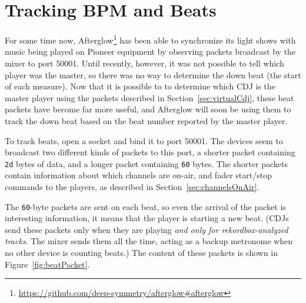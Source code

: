 \documentclass[11pt]{article}
\begin{document}
\section{Tracking BPM and Beats}
\label{sec:beatPackets}

For some time now,
Afterglow\footnote{\url{https://github.com/deep-symmetry/afterglow\#afterglow}}
has been able to synchronize its light shows with music being played
on Pioneer equipment by observing packets broadcast by the mixer to
port 50001. Until recently, however, it was not possible to tell which
player was the master, so there was no way to determine the down beat
(the start of each measure). Now that it is possible to to determine
which CDJ is the master player using the packets described in
Section~\ref{sec:virtualCdj}, these beat packets have become far more
useful, and Afterglow will soon be using them to track the down beat
based on the beat number reported by the master player.

To track beats, open a socket and bind it to port 50001. The devices
seem to broadcast two different kinds of packets to this port, a
shorter packet containing {\tt 2d} bytes of data, and a longer packet
containing {\tt 60} bytes. The shorter packets contain information
about which channels are on-air, and fader start/stop commands to the
players, as described in Section~\ref{sec:channelsOnAir}.

The {\tt 60}-byte packets are sent on each beat, so even the arrival
of the packet is interesting information, it means that the player is
starting a new beat. (CDJs send these packets only when they are
playing \emph{and only for rekordbox-analyzed tracks}. The mixer sends
them all the time, acting as a backup metronome when no other device
is counting beats.) The content of these packets is shown in
Figure~\ref{fig:beatPacket}.
\end{document}
